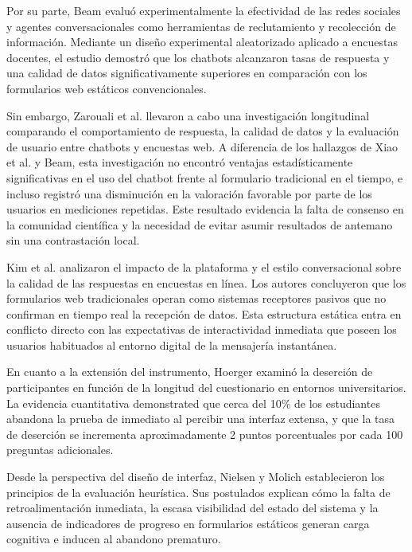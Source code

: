 \documentclass[12pt,letterpaper]{article}
\begin{document}
Por su parte, Beam \cite{beam2023} evaluó experimentalmente la efectividad de las redes sociales y agentes conversacionales como herramientas de reclutamiento y recolección de información. Mediante un diseño experimental aleatorizado aplicado a encuestas docentes, el estudio demostró que los chatbots alcanzaron tasas de respuesta y una calidad de datos significativamente superiores en comparación con los formularios web estáticos convencionales.

Sin embargo, Zarouali et al. \cite{zarouali2023} llevaron a cabo una investigación longitudinal comparando el comportamiento de respuesta, la calidad de datos y la evaluación de usuario entre chatbots y encuestas web. A diferencia de los hallazgos de Xiao et al. y Beam, esta investigación no encontró ventajas estadísticamente significativas en el uso del chatbot frente al formulario tradicional en el tiempo, e incluso registró una disminución en la valoración favorable por parte de los usuarios en mediciones repetidas. Este resultado evidencia la falta de consenso en la comunidad científica y la necesidad de evitar asumir resultados de antemano sin una contrastación local.

Kim et al. \cite{kim2019} analizaron el impacto de la plataforma y el estilo conversacional sobre la calidad de las respuestas en encuestas en línea. Los autores concluyeron que los formularios web tradicionales operan como sistemas receptores pasivos que no confirman en tiempo real la recepción de datos. Esta estructura estática entra en conflicto directo con las expectativas de interactividad inmediata que poseen los usuarios habituados al entorno digital de la mensajería instantánea.

En cuanto a la extensión del instrumento, Hoerger \cite{hoerger2010} examinó la deserción de participantes en función de la longitud del cuestionario en entornos universitarios. La evidencia cuantitativa demonstrated que cerca del 10\% de los estudiantes abandona la prueba de inmediato al percibir una interfaz extensa, y que la tasa de deserción se incrementa aproximadamente 2 puntos porcentuales por cada 100 preguntas adicionales.

Desde la perspectiva del diseño de interfaz, Nielsen y Molich \cite{nielsen1990} establecieron los principios de la evaluación heurística. Sus postulados explican cómo la falta de retroalimentación inmediata, la escasa visibilidad del estado del sistema y la ausencia de indicadores de progreso en formularios estáticos generan carga cognitiva e inducen al abandono prematuro.
\end{document}

